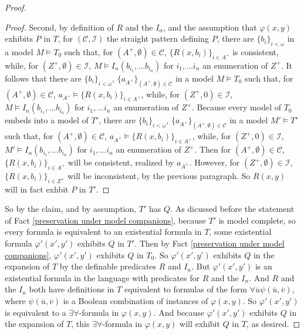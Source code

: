 \documentclass[10pt,a4paper]{amsart}
\begin{document}
\begin{proof}
\begin{proof}
Second, by definition of $R$ and the $I_{n}$, and the assumption that $\varphi(x, y)$ exhibits $P$ in $T$, for $(\mathcal{C}, \mathcal{I})$ the straight pattern defining $P$, there are $\{b_{i}\}_{i < \omega}$ in a model $M \models T_{0}$ such that, for $(A^{+}, \emptyset) \in \mathcal{C}$, $\{R(x, b_{i})\}_{i \in A^{+}}$ is consistent, while, for $(Z^{+}, \emptyset) \in \mathcal{I}$, $M \models I_{n}(b_{i_{1}}, \ldots b_{i_{n}})$ for $i_{1}, \ldots i_{n}$ an enumeration of $Z^{+}$. It follows that there are $\{b_{i}\}_{i < \omega}$, $\{a_{A^{+}}\}_{(A^{+}, \emptyset) \in \mathcal{C}}$ in a model $M \models T_{0}$ such that, for $(A^{+}, \emptyset) \in \mathcal{C}$, $a_{A^{+}} \models \{R(x, b_{i})\}_{i \in A^{+}}$, while, for $(Z^{+}, 0) \in \mathcal{I}$, $M \models I_{n}(b_{i_{1}}, \ldots b_{i_{n}})$ for $i_{1}, \ldots i_{n}$ an enumeration of $Z^{+}$. Because every model of $T_{0}$ embeds into a model of $T'$, there are $\{b_{i}\}_{i < \omega}$, $\{a_{A^{+}}\}_{(A^{+}, \emptyset) \in \mathcal{C}}$ in a model $M' \models T'$ such that, for $(A^{+}, \emptyset) \in \mathcal{C}$, $a_{A^{+}} \models \{R(x, b_{i})\}_{i \in A^{+}}$, while, for $(Z^{+}, 0) \in \mathcal{I}$, $M' \models I_{n}(b_{i_{1}}, \ldots b_{i_{n}})$ for $i_{1}, \ldots i_{n}$ an enumeration of $Z^{+}$. Then for $(A^{+}, \emptyset) \in \mathcal{C}$, $\{R(x, b_{i})\}_{i \in A^{+}}$ will be consistent, realized by $a_{A^{+}}$. However, for $(Z^{+}, \emptyset) \in \mathcal{I}$, $\{R(x, b_{i})\}_{i \in Z^{+}}$ will be inconsistent, by the previous paragraph. So $R(x, y)$ will in fact exhbit $P$ in $T'$.

 
\end{proof}

So by the claim, and by assumption, $T'$ has $Q$. As dicussed before the statement of Fact \ref{preservation under model companions}, because $T'$ is model complete, so every formula is equivalent to an existential formula in $T$, some existential formula $\varphi'(x', y')$ exhibits $Q$ in $T'$. Then by Fact \ref{preservation under model companions}, $\varphi'(x', y')$ exhibits $Q$ in $T_{0}$. So $\varphi'(x', y')$ exhibits $Q$ in the expansion of $T$ by the definable predicates $R$ and $I_{n}$. But $\varphi'(x', y')$ is an existential formula in the language with predicates for $R$ and the $I_{n}$. And $R$ and the $I_{n}$  both have definitions in $T$ equivalent to formulas of the form $\forall \overline{u} \psi(\overline{u}, \overline{v})$, where $\psi(\overline{u}, \overline{v})$ is a Boolean combination of instances of $\varphi(x, y)$. So $\varphi'(x', y')$ is equivalent to a $\exists\forall$-formula in $\varphi(x, y)$. And because $\varphi'(x', y')$  exhibits $Q$ in the expansion of $T$, this $\exists\forall$-formula in $\varphi(x, y)$ will exhibit $Q$ in $T$, as desired.

    
\end{proof}
\end{document}
